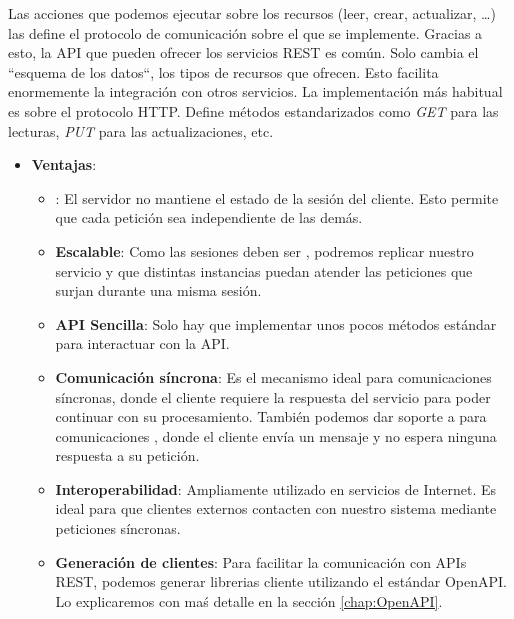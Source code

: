 Las acciones que podemos ejecutar sobre los recursos (leer, crear, actualizar, \dots) las define el protocolo de comunicación sobre el que se implemente. Gracias a esto, la API que pueden ofrecer los servicios REST es común. Solo cambia el ``esquema de los datos``, los tipos de recursos que ofrecen. Esto facilita enormemente la integración con otros servicios. \cite{nallyRESTVsRPC2018} La implementación más habitual es sobre el protocolo HTTP. Define métodos estandarizados como \emph{GET} para las lecturas, \emph{PUT} para las actualizaciones, etc.

\begin{itemize}
  \item \textbf{Ventajas}:

  \begin{itemize}
    \item \textbf{}: El servidor no mantiene el estado de la sesión del cliente. Esto permite que cada petición sea independiente de las demás.

    \item \textbf{Escalable}: Como las sesiones deben ser , podremos replicar nuestro servicio y que distintas instancias puedan atender las peticiones que surjan durante una misma sesión.

    \item \textbf{API Sencilla}: Solo hay que implementar unos pocos métodos estándar para interactuar con la API.

    \item \textbf{Comunicación síncrona}: Es el mecanismo ideal para comunicaciones síncronas, donde el cliente requiere la respuesta del servicio para poder continuar con su procesamiento. También podemos dar soporte a para comunicaciones , donde el cliente envía un mensaje y no espera ninguna respuesta a su petición.

    \item \textbf{Interoperabilidad}: Ampliamente utilizado en servicios de Internet. Es ideal para que clientes externos contacten con nuestro sistema mediante peticiones síncronas. \cite{newmanBuildingMicroservicesDesigning2021}

    \item \textbf{Generación de clientes}: Para facilitar la comunicación con APIs REST, podemos generar librerias cliente utilizando el estándar OpenAPI. Lo explicaremos con maś detalle en la sección \ref{chap:OpenAPI}.
  \end{itemize}


\end{itemize}
